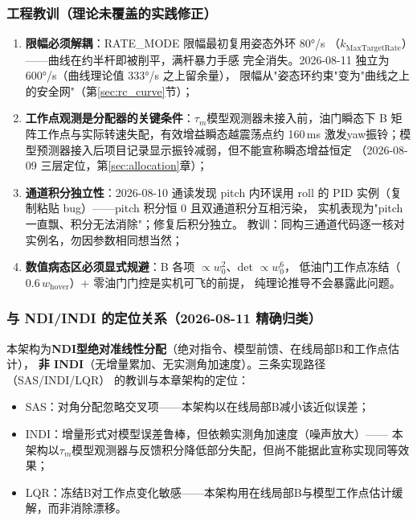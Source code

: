 \subsubsection{工程教训（理论未覆盖的实践修正）}

\begin{enumerate}[label=(\arabic*)]
    \item \textbf{限幅必须解耦}：RATE\_MODE 限幅最初复用姿态外环 80°/s
          （$k_{\mathrm{MaxTargetRate}}$）——曲线在约半杆即被削平，满杆暴力手感
          完全消失。2026-08-11 独立为 600°/s（曲线理论值 333°/s 之上留余量），
          限幅从"姿态环约束"变为"曲线之上的安全网"（第\ref{sec:rc_curve}节）；
    \item \textbf{工作点观测是分配器的关键条件}：$\tau_m$模型观测器未接入前，油门瞬态下
          B 矩阵工作点与实际转速失配，有效增益瞬态越震荡点约 160\,ms
          激发yaw振铃；模型预测器接入后项目记录显示振铃减弱，但不能宣称瞬态增益恒定
          （2026-08-09 三层定位，第\ref{sec:allocation}章）；
    \item \textbf{通道积分独立性}：2026-08-10 通读发现 pitch 内环误用 roll 的
          PID 实例（复制粘贴 bug）——pitch 积分恒 0 且双通道积分互相污染，
          实机表现为"pitch 一直飘、积分无法消除"；修复后积分独立。
          教训：同构三通道代码逐一核对实例名，勿因参数相同想当然；
    \item \textbf{数值病态区必须显式规避}：B 各项 $\propto w_0^2$、det $\propto w_0^6$，
          低油门工作点冻结（$0.6\,w_{\mathrm{hover}}$）+ 零油门门控是实机可飞的前提，
          纯理论推导不会暴露此问题。
\end{enumerate}

\subsubsection{与 NDI/INDI 的定位关系（2026-08-11 精确归类）}

本架构为\textbf{NDI型绝对准线性分配}（绝对指令、模型前馈、在线局部B和工作点估计），
\textbf{非 INDI}（无增量累加、无实测角加速度）。三条实现路径（SAS/INDI/LQR）
的教训与本章架构的定位：
\begin{itemize}
    \item SAS：对角分配忽略交叉项——本架构以在线局部B减小该近似误差；
    \item INDI：增量形式对模型误差鲁棒，但依赖实测角加速度（噪声放大）——
          本架构以$\tau_m$模型观测器与反馈积分降低部分失配，但尚不能据此宣称实现同等效果；
    \item LQR：冻结B对工作点变化敏感——本架构用在线局部B与模型工作点估计缓解，而非消除漂移。
\end{itemize}
